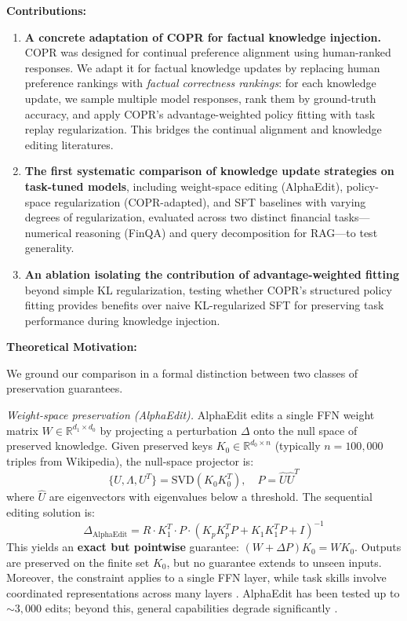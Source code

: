\documentclass{article}
\begin{document}
\textbf{Contributions:}
\begin{enumerate}
    \item \textbf{A concrete adaptation of COPR for factual knowledge injection.} COPR \citep{zhang2024copr} was designed for continual preference alignment using human-ranked responses. We adapt it for factual knowledge updates by replacing human preference rankings with \emph{factual correctness rankings}: for each knowledge update, we sample multiple model responses, rank them by ground-truth accuracy, and apply COPR's advantage-weighted policy fitting with task replay regularization. This bridges the continual alignment and knowledge editing literatures.

    \item \textbf{The first systematic comparison of knowledge update strategies on task-tuned models}, including weight-space editing (AlphaEdit), policy-space regularization (COPR-adapted), and SFT baselines with varying degrees of regularization, evaluated across two distinct financial tasks---numerical reasoning (FinQA) and query decomposition for RAG---to test generality.

    \item \textbf{An ablation isolating the contribution of advantage-weighted fitting} beyond simple KL regularization, testing whether COPR's structured policy fitting provides benefits over naive KL-regularized SFT for preserving task performance during knowledge injection.
\end{enumerate}

\bigskip

\textbf{Theoretical Motivation:}

We ground our comparison in a formal distinction between two classes of preservation guarantees.

\textit{Weight-space preservation (AlphaEdit).}
AlphaEdit \citep{fang2025alphaedit} edits a single FFN weight matrix $W \in \mathbb{R}^{d_1 \times d_0}$ by projecting a perturbation $\Delta$ onto the null space of preserved knowledge. Given preserved keys $K_0 \in \mathbb{R}^{d_0 \times n}$ (typically $n = 100{,}000$ triples from Wikipedia), the null-space projector is:
\begin{equation}
    \{U, \Lambda, U^T\} = \mathrm{SVD}(K_0 K_0^T), \quad P = \hat{U}\hat{U}^T
\end{equation}
where $\hat{U}$ are eigenvectors with eigenvalues below a threshold. The sequential editing solution is:
\begin{equation}
    \Delta_{\text{AlphaEdit}} = R \cdot K_1^T \cdot P \cdot (K_p K_p^T P + K_1 K_1^T P + I)^{-1}
\end{equation}
This yields an \textbf{exact but pointwise} guarantee: $(W + \Delta P) K_0 = W K_0$. Outputs are preserved on the finite set $K_0$, but no guarantee extends to unseen inputs. Moreover, the constraint applies to a single FFN layer, while task skills involve coordinated representations across many layers \citep{wang2025finetune}. AlphaEdit has been tested up to ${\sim}3{,}000$ edits; beyond this, general capabilities degrade significantly \citep{li2024shouldwe}.
\end{document}
